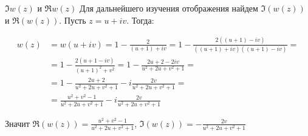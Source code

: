 \begin{frame}{\(\Im w(z)\) и \(\Re w(z)\)}
	Для дальнейшего изучения отображения найдем \( \Im(w(z)) \) и \( \Re(w(z)) \).
	Пусть \( z = u + i v \). Тогда:

	\begin{align*}
		w(z) & = w(u + iv) = 1 - \frac{2}{(u + 1) + iv} = 1 - \frac{2((u + 1) - iv)}{((u+1)+iv)((u+1)-iv)} = \\
		     & = 1 - \frac{2(u + 1 - iv)}{(u+1)^2 + v^2} = 1 - \frac{2u + 2 - 2iv}{u^2 + 2u + v^2 + 1} =     \\
		     & = 1 - \frac{2u+2}{u^2+2u+v^2+1} - i\frac{2v}{u^2+2u+v^2+1} =                                  \\
		     & = \frac{u^2 +v^2 - 1}{u^2+2u+v^2+1} - i \frac{2v}{u^2+2u+v^2+1}
	\end{align*}

	Значит \( \Re(w(z)) = \frac{u^2+v^2-1}{u^2+2u+v^2+1} \), \( \Im(w(z)) = - \frac{2v}{u^2+2u+v^2+1} \)
\end{frame}

